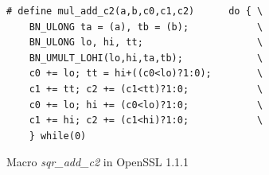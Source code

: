 \begin{figure}
    \centering
    \begin{lstlisting}[xleftmargin=.02\textwidth,xrightmargin=.01\textwidth]
# define mul_add_c2(a,b,c0,c1,c2)      do { \
    BN_ULONG ta = (a), tb = (b);            \
    BN_ULONG lo, hi, tt;                    \
    BN_UMULT_LOHI(lo,hi,ta,tb);             \
    c0 += lo; tt = hi+((c0<lo)?1:0);        \
    c1 += tt; c2 += (c1<tt)?1:0;            \
    c0 += lo; hi += (c0<lo)?1:0;            \
    c1 += hi; c2 += (c1<hi)?1:0;            \
    } while(0)
\end{lstlisting}
    \vspace*{-6pt}
    \caption{Macro \textit{sqr\_add\_c2} in OpenSSL 1.1.1}
    \label{fig:new_sqr2}
    \vspace*{-6pt}
\end{figure}




